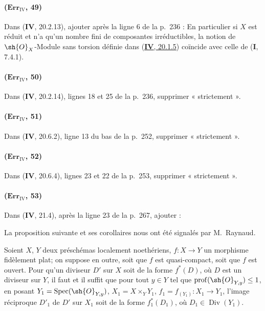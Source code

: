 \paragraph{($\mathbf{Err}_{\mathrm{IV}}$, 49)}
Dans (\textbf{IV}, 20.2.13), ajouter après la ligne 6 de la p.~236 : En
particulier si $X$ est réduit et n'a qu'un nombre fini de composantes
irréductibles, la notion de $\sh{O}_X$-Module sans torsion définie dans
({\hyperlink{ega4.c04.statement.20-1-5}{\textbf{IV}, 20.1.5}}) coïncide avec
celle de (\textbf{I}, 7.4.1).

\paragraph{($\mathbf{Err}_{\mathrm{IV}}$, 50)}
Dans (\textbf{IV}, 20.2.14), lignes 18 et 25 de la p.~236, supprimer
« strictement ».

\paragraph{($\mathbf{Err}_{\mathrm{IV}}$, 51)}
Dans (\textbf{IV}, 20.6.2), ligne 13 du bas de la p.~252, supprimer
« strictement ».

\paragraph{($\mathbf{Err}_{\mathrm{IV}}$, 52)}
Dans (\textbf{IV}, 20.6.4), lignes 23 et 22 de la p.~253, supprimer
« strictement ».

\paragraph{($\mathbf{Err}_{\mathrm{IV}}$, 53)}
Dans (\textbf{IV}, 21.4), après la ligne 23 de la p.~267, ajouter :

La proposition suivante et ses corollaires nous ont été signalés par
M.~Raynaud.

\begin{proposition}[21.4.9]
Soient $X$, $Y$ deux préschémas localement noethériens,
$f:X\to Y$ un morphisme fidèlement plat; on suppose en outre, \textup{soit} que
$f$ est quasi-compact, \textup{soit} que $f$ est ouvert. Pour qu'un diviseur
$D'$ sur $X$ soit de la forme $f^*(D)$, où $D$ est un diviseur sur
$Y$, il faut et il suffit que pour tout $y\in Y$ tel que
$\operatorname{prof}(\sh{O}_{Y,y})\leq1$, en posant
$Y_1=\operatorname{Spec}(\sh{O}_{Y,y})$,
$X_1=X\times_YY_1$,
$f_1=f_{(Y_1)}:X_1\to Y_1$,
l'image réciproque $D'_1$ de $D'$ sur $X_1$ soit de la forme
$f_1^*(D_1)$, où $D_1\in\operatorname{Div}(Y_1)$.
\end{proposition}

